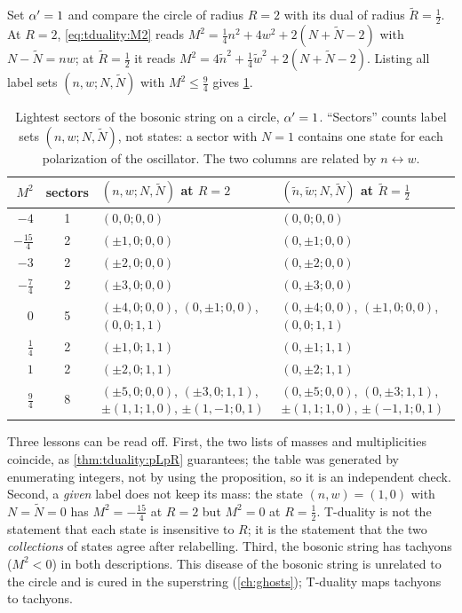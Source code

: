\begin{example}\label{ex:tduality:table}
Set $\alpha'=1$ and compare the circle of radius $R=2$ with its dual of radius $\tilde R=\frac12$.
At $R=2$, \eqref{eq:tduality:M2} reads $M^2=\frac14n^2+4w^2+2(N+\tilde N-2)$ with
$N-\tilde N=nw$; at $\tilde R=\frac12$ it reads $M^2=4\tilde n^2+\frac14\tilde w^2+2(N+\tilde N-2)$.
Listing all label sets $(n,w;N,\tilde N)$ with $M^2\le\frac94$ gives \cref{tab:tduality:example}.

\begin{table}[ht]
\centering
\caption{Lightest sectors of the bosonic string on a circle, $\alpha'=1$. ``Sectors'' counts label
sets $(n,w;N,\tilde N)$, not states: a sector with $N=1$ contains one state for each
polarization of the oscillator. The two columns are related by $n\leftrightarrow w$.}
\label{tab:tduality:example}
\small
\begin{tabular}{@{}rcp{}p{}@{}}\toprule
$M^2$ & sectors & $(n,w;N,\tilde N)$ at $R=2$ & $(\tilde n,\tilde w;N,\tilde N)$ at $\tilde R=\frac12$\\\midrule
$-4$ & 1 & $(0,0;0,0)$ & $(0,0;0,0)$\\
$-\frac{15}4$ & 2 & $(\pm1,0;0,0)$ & $(0,\pm1;0,0)$\\
$-3$ & 2 & $(\pm2,0;0,0)$ & $(0,\pm2;0,0)$\\
$-\frac74$ & 2 & $(\pm3,0;0,0)$ & $(0,\pm3;0,0)$\\
$0$ & 5 & $(\pm4,0;0,0)$, $(0,\pm1;0,0)$, $(0,0;1,1)$ & $(0,\pm4;0,0)$, $(\pm1,0;0,0)$, $(0,0;1,1)$\\
$\frac14$ & 2 & $(\pm1,0;1,1)$ & $(0,\pm1;1,1)$\\
$1$ & 2 & $(\pm2,0;1,1)$ & $(0,\pm2;1,1)$\\
$\frac94$ & 8 & $(\pm5,0;0,0)$, $(\pm3,0;1,1)$, $\pm(1,1;1,0)$, $\pm(1,-1;0,1)$ &
  $(0,\pm5;0,0)$, $(0,\pm3;1,1)$, $\pm(1,1;1,0)$, $\pm(-1,1;0,1)$\\\bottomrule
\end{tabular}
\end{table}

Three lessons can be read off. First, the two lists of masses and multiplicities coincide, as
\cref{thm:tduality:pLpR} guarantees; the table was generated by enumerating integers, not by
using the proposition, so it is an independent check. Second, a \emph{given} label does not
keep its mass: the state $(n,w)=(1,0)$ with $N=\tilde N=0$ has $M^2=-\frac{15}4$ at $R=2$ but
$M^2=0$ at $R=\frac12$. T-duality is not the statement that each state is insensitive to $R$;
it is the statement that the two \emph{collections} of states agree after relabelling. Third,
the bosonic string has tachyons ($M^2<0$) in both descriptions. This disease of the bosonic
string is unrelated to the circle and is cured in the superstring (\cref{ch:ghosts});
T-duality maps tachyons to tachyons.
\end{example}

